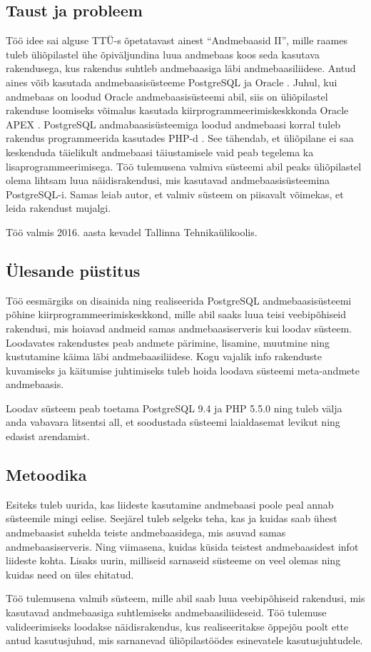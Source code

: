\documentclass[a4paper,12pt]{article} %
\begin{document}
\subsection{Taust ja probleem}
Töö idee sai alguse TTÜ-s õpetatavast ainest ``Andmebaasid II'', mille raames tuleb üliõpilastel ühe õpiväljundina luua andmebaas koos seda kasutava rakendusega, kus rakendus suhtleb andmebaasiga läbi andmebaasiliidese. Antud aines võib kasutada andmebaasisüsteeme PostgreSQL \cite{PostgreSQL} ja Oracle \cite{Oracle_DB}. Juhul, kui andmebaas on loodud Oracle andmebaasisüsteemi abil, siis on üliõpilastel rakenduse loomiseks võimalus kasutada kiirprogrammeerimiskeskkonda Oracle APEX \cite{Oracle_APEX}. PostgreSQL andmabaasisüsteemiga loodud andmebaasi korral tuleb rakendus programmeerida kasutades PHP-d \cite{PHP}. See tähendab, et üliõpilane ei saa keskenduda täielikult andmebaasi täiustamisele vaid peab tegelema ka lisaprogrammeerimisega. Töö tulemusena valmiva süsteemi abil peaks üliõpilastel olema lihtsam luua näidisrakendusi, mis kasutavad andmebaasisüsteemina PostgreSQL-i. Samas leiab autor, et valmiv süsteem on piisavalt võimekas, et leida rakendust mujalgi.\par
Töö valmis 2016. aasta kevadel Tallinna Tehnikaülikoolis.

\subsection{Ülesande püstitus}
Töö eesmärgiks on disainida ning realiseerida PostgreSQL andmebaasisüsteemi põhine kiirprogrammeerimiskeskkond, mille abil saaks luua teisi veebipõhiseid rakendusi, mis hoiavad andmeid samas andmebaasiserveris kui loodav süsteem. Loodavates rakendustes peab andmete pärimine, lisamine, muutmine ning kustutamine käima läbi andmebaasiliidese. Kogu vajalik info rakenduste kuvamiseks ja käitumise juhtimiseks tuleb hoida loodava süsteemi meta-andmete andmebaasis.\par
Loodav süsteem peab toetama PostgreSQL 9.4 ja PHP 5.5.0 ning tuleb välja anda vabavara litsentsi all, et soodustada süsteemi laialdasemat levikut ning edasist arendamist.

\subsection{Metoodika}
Esiteks tuleb uurida, kas liideste kasutamine andmebaasi poole peal annab süsteemile mingi eelise. Seejärel tuleb selgeks teha, kas ja kuidas saab ühest andmebaasist suhelda teiste andmebaasidega, mis asuvad samas andmebaasiserveris. Ning viimasena, kuidas küsida teistest andmebaasidest infot liideste kohta.
Lisaks uurin, milliseid sarnaseid süsteeme on veel olemas ning kuidas need on üles ehitatud.\par
Töö tulemusena valmib süsteem, mille abil saab luua veebipõhiseid rakendusi, mis kasutavad andmebaasiga suhtlemiseks andmebaasiliideseid. Töö tulemuse valideerimiseks loodakse näidisrakendus, kus realiseeritakse õppejõu poolt ette antud kasutusjuhud, mis sarnanevad üliõpilastöödes esinevatele kasutusjuhtudele.
\end{document}
